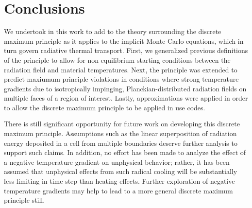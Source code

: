 \section{Conclusions}
We undertook in this work to add to the theory surrounding the discrete
maximum principle as it applies to the implicit Monte Carlo equations, which in
turn govern radiative thermal transport.  First, we generalized previous
definitions of the principle \cite{WolLarDen} to allow for non-equilibrium
starting conditions between the radiation field and material temperatures. 
Next, the principle was extended to predict maxiumum principle violations in
conditions where strong temperature gradients due to isotropically impinging,
Planckian-distributed radiation fields on multiple faces of a
region of interest.  Lastly, approximations were applied in order to allow the
discrete maximum principle to be applied in use codes.%

There is still significant opportunity for future work on developing this
discrete maximum principle.  Assumptions such as the linear superposition of
radiation energy deposited in a cell from multiple boundaries deserve further
analysis to support such claims.  In addition, no effort has been made to
analyze the effect of a negative temperature gradient on unphysical behavior;
rather, it has been assumed that unphysical effects from such radical cooling
will be substantially less limiting in time step than heating effects.  Further
exploration of negative temperature gradients may help to lead to a more
general discrete maximum principle still.